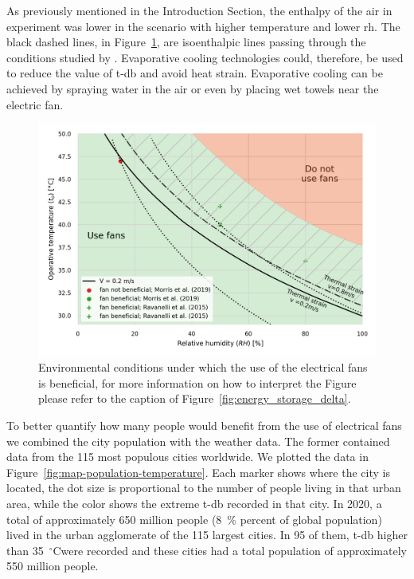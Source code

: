 As previously mentioned in the Introduction Section, the enthalpy of the air in  experiment was lower in the scenario with higher temperature and lower \ac{rh}.
The black dashed lines, in Figure~\ref{fig:use_fans_experimental}, are isoenthalpic lines passing through the conditions studied by .
Evaporative cooling technologies could, therefore, be used to reduce the value of \ac{t-db} and avoid heat strain.
Evaporative cooling can be achieved by spraying water in the air or even by placing wet towels near the electric fan.

\begin{figure}[thb!]
    \centering
    \includegraphics[width=\textwidth]{figures/summary_use_fans_comparison_experimental}
    \caption{Environmental conditions under which the use of the electrical fans is beneficial, for more information on how to interpret the Figure please refer to the caption of Figure~\ref{fig:energy_storage_delta}.
    }
    \label{fig:use_fans_experimental}
\end{figure}


To better quantify how many people would benefit from the use of electrical fans we combined the city population with the weather data.
The former contained data from the 115 most populous cities worldwide.
We plotted the data in Figure~\ref{fig:map-population-temperature}.
Each marker shows where the city is located, the dot size is proportional to the number of people living in that urban area, while the color shows the extreme \ac{t-db} recorded in that city.
In 2020, a total of approximately 650 million people (8~\% percent of global population) lived in the urban agglomerate of the 115 largest cities.
In 95 of them, \ac{t-db} higher than 35~$^{\circ}$C\@ were recorded and these cities had a total population of approximately 550 million people.

